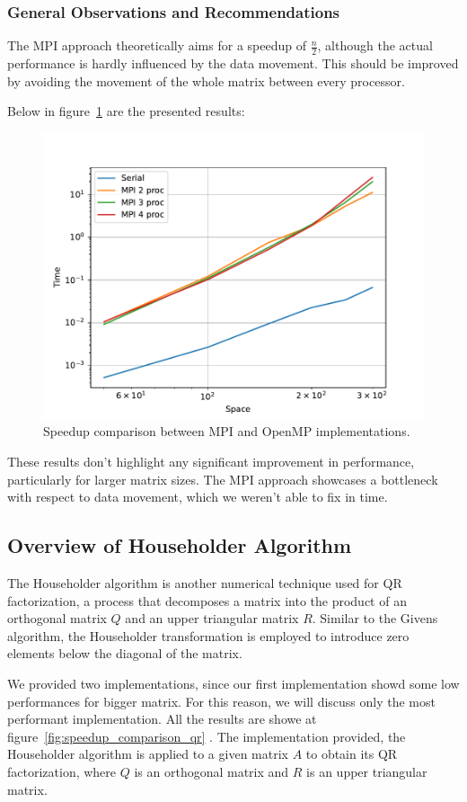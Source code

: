 \documentclass{article}
\begin{document}
\subsubsection{General Observations and Recommendations}

The MPI approach theoretically aims for a speedup of \( \frac{n}{2} \), although the actual performance is hardly influenced by the data movement. This should be improved by avoiding the movement of the whole matrix between every processor.

Below in figure~\ref{fig:speedup_comparison} are the presented results:

\begin{figure}[h]
    \centering
    \includegraphics[width=0.5\linewidth]{mpi.pdf}
    \caption{Speedup comparison between MPI and OpenMP implementations.}
    \label{fig:speedup_comparison}
\end{figure}

These results don't highlight any significant improvement in performance, particularly for larger matrix sizes. The MPI approach showcases a bottleneck with respect to data movement, which we weren't able to fix in time.






\subsection{Overview of Householder Algorithm}

The Householder algorithm is another numerical technique used for QR factorization, a process that decomposes a matrix into the product of an orthogonal matrix \(Q\) and an upper triangular matrix \(R\). Similar to the Givens algorithm, the Householder transformation is employed to introduce zero elements below the diagonal of the matrix.

We provided two implementations, since our first implementation showd some low performances for bigger matrix. For this reason, we will discuss only the most performant implementation. All the results are showe at figure~\ref{fig:speedup_comparison_qr} .
The implementation provided, the Householder algorithm is applied to a given matrix $A$ to obtain its QR factorization, where $Q$ is an orthogonal matrix and $R$ is an upper triangular matrix.
\end{document}
